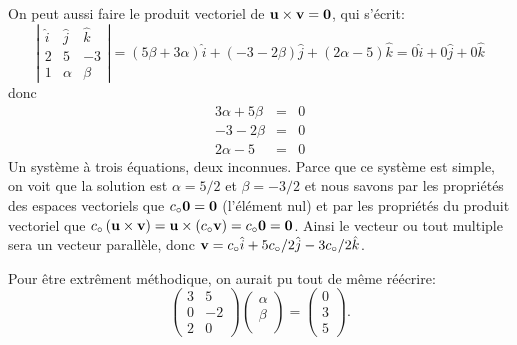 \begin{enumerate}
  On peut aussi faire le produit vectoriel de
  \({\bf u} \times {\bf v} = {\bf 0}\), qui s'écrit: \[
  \left|
  \begin{array}{c}
  \hat{i} & \hat{j} & \hat{k} \\
  2 & 5 & -3 \\
  1 & \alpha & \beta 
  \end{array}
  \right| 
  =
  (5 \beta + 3 \alpha)\hat{i} + (-3 - 2\beta)\hat{j} + (2 \alpha - 5)\hat{k}
  = 
  0\hat{i} + 0\hat{j} + 0\hat{k}
  \] donc \[
  \begin{eqnarray}
  3 \alpha + 5 \beta  & = & 0 \\
  -3 - 2\beta & = & 0 \\
  2 \alpha - 5 & = & 0 
  \end{eqnarray}
  \] Un système à trois équations, deux inconnues. Parce que ce système
  est simple, on voit que la solution est \(\alpha = 5/2\) et
  \(\beta = -3/2\) et nous savons par les propriétés des espaces
  vectoriels que \(c_\circ {\bf 0} = {\bf 0}\) (l'élément nul) et par
  les propriétés du produit vectoriel que
  \(c_\circ \left({\bf u} \times {\bf v} \right) = {\bf u} \times (c_\circ {\bf v}) = c_\circ {\bf 0} = {\bf 0}\).
  Ainsi le vecteur ou tout multiple sera un vecteur parallèle, donc
  \({\bf v} = c_\circ\hat{i} + 5c_\circ/2\hat{j} - 3c_\circ/2\hat{k}\).

  Pour être extrêment méthodique, on aurait pu tout de même réécrire: \[
  \left(
  \begin{array}{cc}
  3 & 5 \\
  0 & -2 \\
  2 & 0 
  \end{array}
  \right)
  \left(
  \begin{array}{c}
  \alpha \\
  \beta \\
  \end{array}
  \right)
  =
  \left(
  \begin{array}{c}
  0 \\
  3 \\
  5
  \end{array}
  \right).
  \]


\end{enumerate}

